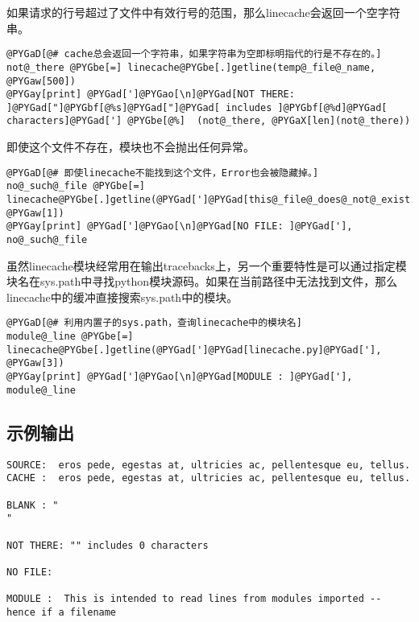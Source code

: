 \documentclass[a4paper,10pt,english]{manual}
\begin{document}
如果请求的行号超过了文件中有效行号的范围，那么linecache会返回一个空字符串。

\begin{Verbatim}[commandchars=@\[\]]
@PYGaD[@# cache总会返回一个字符串，如果字符串为空即标明指代的行是不存在的。]
not@_there @PYGbe[=] linecache@PYGbe[.]getline(temp@_file@_name, @PYGaw[500])
@PYGay[print] @PYGad[']@PYGao[\n]@PYGad[NOT THERE: ]@PYGad["]@PYGbf[@%s]@PYGad["]@PYGad[ includes ]@PYGbf[@%d]@PYGad[ characters]@PYGad['] @PYGbe[@%]  (not@_there, @PYGaX[len](not@_there))
\end{Verbatim}

即使这个文件不存在，模块也不会抛出任何异常。

\begin{Verbatim}[commandchars=@\[\]]
@PYGaD[@# 即使linecache不能找到这个文件，Error也会被隐藏掉。]
no@_such@_file @PYGbe[=] linecache@PYGbe[.]getline(@PYGad[']@PYGad[this@_file@_does@_not@_exist.txt]@PYGad['], @PYGaw[1])
@PYGay[print] @PYGad[']@PYGao[\n]@PYGad[NO FILE: ]@PYGad['], no@_such@_file
\end{Verbatim}

虽然linecache模块经常用在输出tracebacks上，另一个重要特性是可以通过指定模块名在sys.path中寻找python模块源码。如果在当前路径中无法找到文件，那么linecache中的缓冲直接搜索sys.path中的模块。

\begin{Verbatim}[commandchars=@\[\]]
@PYGaD[@# 利用内置子的sys.path，查询linecache中的模块名]
module@_line @PYGbe[=] linecache@PYGbe[.]getline(@PYGad[']@PYGad[linecache.py]@PYGad['], @PYGaw[3])
@PYGay[print] @PYGad[']@PYGao[\n]@PYGad[MODULE : ]@PYGad['], module@_line
\end{Verbatim}


\subsection{示例输出}

\begin{Verbatim}[commandchars=@\[\]]
SOURCE:  eros pede, egestas at, ultricies ac, pellentesque eu, tellus.
CACHE :  eros pede, egestas at, ultricies ac, pellentesque eu, tellus.

BLANK : "
"

NOT THERE: "" includes 0 characters

NO FILE:

MODULE :  This is intended to read lines from modules imported -- hence if a filename
\end{Verbatim}
\end{document}
